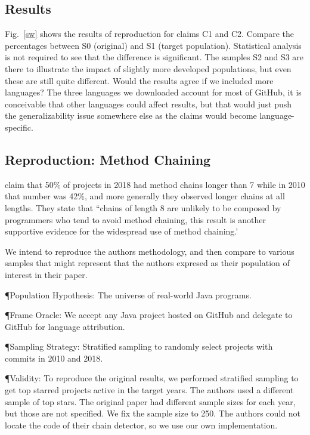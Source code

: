 \documentclass[sigconf,review,anonymous]{acmart}
\newcommand{\gh}{{GitHub}\xspace}
\begin{document}
\vspace{-5mm}

\subsection*{Results}

Fig.~\ref{sw} shows the results of reproduction for claims C1 and C2. Compare
the percentages between S0 (original) and S1 (target population). Statistical
analysis is not required to see that the difference is significant. The samples
S2 and S3 are there to illustrate the impact of slightly more developed
populations, but even these are still quite different. Would the results agree
if we included more languages? The three languages we downloaded account for
most of \gh, it is conceivable that other languages could affect results, but
that would just push the generalizability issue somewhere else as the claims would
become language-specific.

\newpage
\subsection{Reproduction: Method Chaining}

\citet{nakamaru:2020:MSR} claim that 50\% of projects in 2018 had method chains
longer than 7 while in 2010 that number was 42\%, and more generally they
observed longer chains at all lengths. They state that ``chains of length 8 are
unlikely to be composed by programmers who tend to avoid method chaining, this
result is another supportive evidence for the widespread use of method
chaining.'

We intend to reproduce the authors methodology, and then compare to various
samples that might represent that the authors expresed as their population of
interest in their paper.

\P{Population Hypothesis:} The universe of real-world Java programs.

\P{Frame Oracle:} We accept any Java project hosted on \gh
and delegate to GitHub for language attribution.

\P{Sampling Strategy:} Stratified sampling to randomly select projects with commits
in 2010 and 2018.

\P{Validity:} To reproduce the original results, we performed stratified
sampling to get top starred projects active in the target years. The authors
used a different sample of top stars. The original paper had different sample
sizes for each year, but those are not specified. We fix the sample size to 250.
The authors could not locate the code of their chain detector, so we use
our own implementation.
\end{document}
